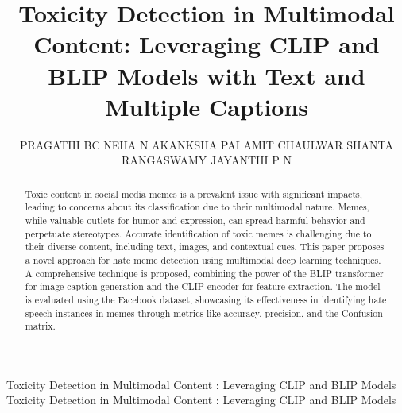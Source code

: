 \documentclass{ieeeaccess}
\begin{document}

\title{Toxicity Detection in Multimodal Content: Leveraging CLIP and BLIP Models with Text and Multiple Captions}
\author{\uppercase{Pragathi BC} \uppercase{Neha N} \uppercase{Akanksha Pai} \uppercase{Amit Chaulwar} \uppercase{Shanta Rangaswamy} \uppercase{Jayanthi P N}}
\address[1]{Computer Science and Engineering, RV College of Engineering®, Bengaluru, India}
\address[2]{Computer Science and Engineering, RV College of Engineering®, Bengaluru, India}
\address[3]{Computer Science and Engineering, RV College of Engineering®, Bengaluru, India}
\address[4]{Samsung India Ltd, Bengaluru, India}
\address[5]{Computer Science and Engineering, RV College of Engineering®, Bengaluru, India}
\address[6]{Computer Science and Engineering, RV College of Engineering®, Bengaluru, India}

\markboth
{Toxicity Detection in Multimodal Content \headeretal:  Leveraging CLIP and BLIP Models}
{Toxicity Detection in Multimodal Content \headeretal:  Leveraging CLIP and BLIP Models
}


\begin{abstract}
Toxic content in social media memes is a prevalent issue with significant impacts, leading to concerns about its classification due to their multimodal nature. Memes, while valuable outlets for humor and expression, can spread harmful behavior and perpetuate stereotypes. Accurate identification of toxic memes is challenging due to their diverse content, including text, images, and contextual cues. This paper proposes a novel approach for hate meme detection using multimodal deep learning techniques. A comprehensive technique is proposed, combining the power of the BLIP transformer for image caption generation and the CLIP encoder for feature extraction. The model is evaluated using the Facebook dataset, showcasing its effectiveness in identifying hate speech instances in memes through metrics like accuracy, precision, and the Confusion matrix.
\end{abstract}
\end{document}
